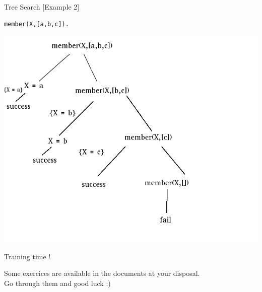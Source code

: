 \documentclass[11pt]{beamer}
\begin{document}
\begin{frame}[fragile]{Tree Search [Example 2]}

\begin{lstlisting}[xleftmargin=.17\textwidth]
member(X,[a,b,c]).
\end{lstlisting}

\begin{center}

\includegraphics[scale=0.45]{resolution_2.png}
\end{center}	

\end{frame}

\begin{frame}{Training time !}

	Some exercices are available in the documents at your disposal.\\ Go through them and good luck :)

\end{frame}
\end{document}
